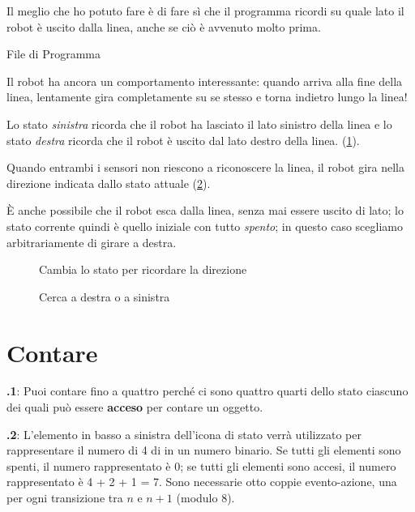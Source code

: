 \documentclass[12pt,a4paper,italian]{article}
\begin{document}
Il meglio che ho potuto fare è di fare sì che il programma ricordi su quale lato il
robot è uscito dalla linea, anche se ciò è avvenuto molto prima.

{\raggedleft \hfill File di Programma }

Il robot ha ancora un comportamento interessante: quando arriva alla fine della
linea, lentamente gira completamente su se stesso e torna indietro
lungo la linea!

Lo stato \emph{sinistra}  ricorda che il robot ha lasciato il
lato sinistro della linea e lo stato \emph{destra} 
ricorda che il robot è uscito dal lato destro della linea.
(\cref{fig.follow3}).

Quando entrambi i sensori non riescono a riconoscere la linea, il robot gira nella
direzione indicata dallo stato attuale (\cref{fig.follow1}).

È anche possibile che il robot esca dalla linea, senza mai
essere uscito di lato; lo stato corrente quindi è quello iniziale con tutto \emph{spento};
in questo caso scegliamo arbitrariamente di girare a destra. 

\begin{figure}
\begin{center}
\caption{Cambia lo stato per ricordare la direzione}\label{fig.follow3}
\end{center}
\end{figure}

\begin{figure}
\begin{center}
\caption{Cerca a destra o a sinistra}\label{fig.follow1}
\end{center}
\end{figure}

\clearpage

\section{Contare}

\textbf{\thesection.1}:
Puoi contare fino a quattro perché ci sono quattro quarti dello stato
ciascuno dei quali può essere \textbf{acceso} per contare un oggetto.

\textbf{\thesection.2}:
L'elemento in basso a sinistra dell'icona di stato verrà utilizzato per rappresentare il
numero di 4 di in un numero binario. Se tutti gli elementi sono spenti, il numero rappresentato
è 0; se tutti gli elementi sono accesi, il numero rappresentato è 4 + 2 + 1 = 7.
Sono necessarie otto coppie evento-azione, una per ogni transizione tra $n$ e
$n+1$ (modulo 8).
\end{document}
